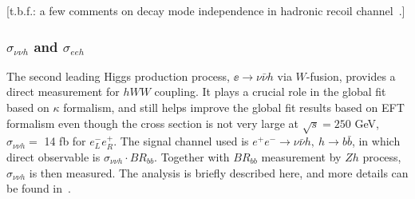 [t.b.f.: a few comments on decay mode independence in hadronic recoil channel~\cite{}.]

\subsubsection{$\sigma_{\nu\nu h}$ and $\sigma_{eeh}$}
The second leading Higgs production process, 
$\ee\to\nu\bar{\nu}h$ via $W$-fusion, provides a direct measurement
for $hWW$ coupling. It plays a crucial role in the global fit based on $\kappa$ formalism,
and still helps improve the global fit results based on EFT formalism even though 
the cross section is not very large at $\sqrt{s}=250$ GeV, 
$\sigma_{\nu\nu h}=$ 14 fb for $e^-_Le^+_R$. 
The signal channel used is 
$e^+e^-\to\nu\bar{\nu}h,~h\to b\bar{b}$, in which direct observable is
$\sigma_{\nu\nu h}\cdot BR_{bb}$. Together with $BR_{bb}$ measurement
by $Zh$ process, $\sigma_{\nu\nu h}$ is then measured.
The analysis is briefly described here, and more details can be found 
in~\cite{Durig:2014lfa,Tian:2017}. 

